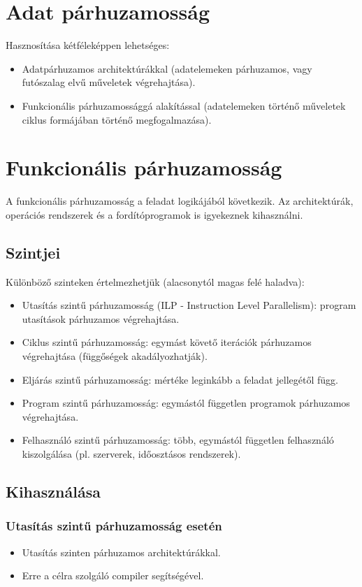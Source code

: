 \section{Adat párhuzamosság}
Hasznosítása kétféleképpen lehetséges:
\begin{itemize}
    \item Adatpárhuzamos architektúrákkal (adatelemeken párhuzamos, vagy futószalag elvű műveletek végrehajtása).
    \item Funkcionális párhuzamossággá alakítással (adatelemeken történő műveletek ciklus formájában történő megfogalmazása).
\end{itemize}

\section{Funkcionális párhuzamosság}
A funkcionális párhuzamosság a feladat logikájából következik.
Az architektúrák, operációs rendszerek és a fordítóprogramok is igyekeznek kihasználni.

\subsection{Szintjei}
Különböző szinteken értelmezhetjük (alacsonytól magas felé haladva):
\begin{itemize}
    \item Utasítás szintű párhuzamosság (ILP - Instruction Level Parallelism): program utasítások párhuzamos végrehajtása.
    \item Ciklus szintű párhuzamosság: egymást követő iterációk párhuzamos végrehajtása (függőségek akadályozhatják).
    \item Eljárás szintű párhuzamosság: mértéke leginkább a feladat jellegétől függ.
    \item Program szintű párhuzamosság: egymástól független programok párhuzamos végrehajtása.
    \item Felhasználó szintű párhuzamosság: több, egymástól független felhasználó kiszolgálása (pl. szerverek, időosztásos rendszerek).
\end{itemize}

\subsection{Kihasználása}
\subsubsection{Utasítás szintű párhuzamosság esetén}
\begin{itemize}
    \item Utasítás szinten párhuzamos architektúrákkal.
    \item Erre a célra szolgáló compiler segítségével.
\end{itemize}
